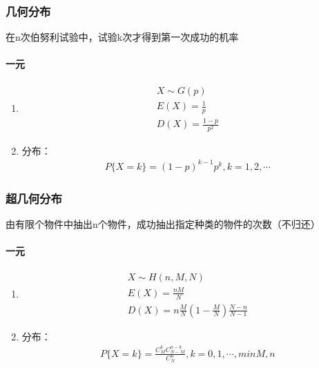 \documentclass[12pt]{book}
\begin{document}
\subsubsection{几何分布}

在n次伯努利试验中，试验k次才得到第一次成功的机率


\paragraph{一元} 


\begin{enumerate}[1.]
    \item \begin{gather*}
              X\sim G(p) \\
              E(X)=\frac{1}{p} \\
              D(X)=\frac{1-p}{p^2}
          \end{gather*}
    \item 分布：
          \begin{gather*}
              P\{X=k\}=(1-p)^{k-1} p^k, k=1,2,\cdots
          \end{gather*}
\end{enumerate}





\subsubsection{超几何分布}



由有限个物件中抽出n个物件，成功抽出指定种类的物件的次数（不归还）


\paragraph{一元}


\begin{enumerate}[1.]
    \item \begin{gather*}
              X\sim H(n,M,N) \\
              E(X)=\frac{nM}{N} \\
              D(X)=n\frac{M}{N}\left(1-\frac{M}{N}\right)\frac{N-n}{N-1}
          \end{gather*}
    \item 分布：
          \begin{gather*}
              P\{X=k\} = \frac{ C_{M}^{k} C_{N-M}^{n-k} }{ C_{N}^{n} }, k=0,1,\cdots,min{M,n}
          \end{gather*}
\end{enumerate}
\end{document}
